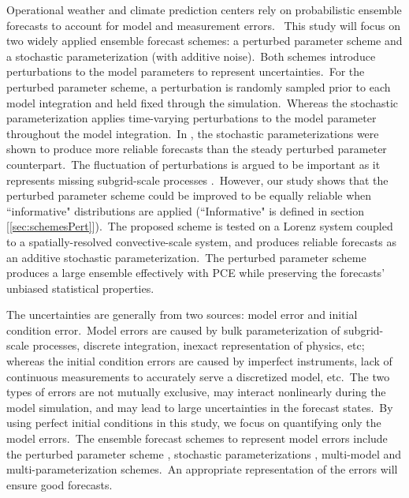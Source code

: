 
	Operational weather and climate prediction centers rely on
	probabilistic ensemble forecasts to account for model and measurement errors.\ 
	This study will focus on two widely applied ensemble forecast schemes: 
	a perturbed parameter scheme and a stochastic parameterization (with additive noise).\ 
	Both schemes introduce perturbations to the model parameters to represent uncertainties.\
	For the perturbed parameter scheme, a perturbation is randomly sampled 
	prior to each model integration and held fixed through the simulation.\
	Whereas the stochastic parameterization applies time-varying perturbations 
	to the model parameter throughout the model integration.\ 
	In \citet{Arnold13}, the stochastic parameterizations were shown to 
	produce more reliable forecasts than the steady perturbed parameter counterpart.\
	The fluctuation of perturbations is argued to be important 
	as it represents missing subgrid-scale processes \citep{Palmer01}.\ 
	However, our study shows that the perturbed parameter scheme could be improved to 
	be equally reliable when ``informative" distributions are applied
	(``Informative" is defined in section  [\ref{sec:schemesPert}]).\ 
	The proposed scheme is tested on a Lorenz system
	coupled to a spatially-resolved convective-scale system,
	and produces reliable forecasts as an additive stochastic parameterization.\ 
	The perturbed parameter scheme produces a large ensemble effectively
	with PCE while preserving the forecasts' unbiased statistical properties.\


	The uncertainties are generally from two sources:
	model error and initial condition error.\
	Model errors are caused by bulk parameterization of subgrid-scale processes, 
	discrete integration, inexact representation of physics, etc;
	whereas the initial condition errors are caused by 
	imperfect instruments, lack of continuous  
	measurements to accurately serve a discretized model, etc.\
	The two types of errors are not mutually exclusive, 
	may interact nonlinearly during the model simulation, 
	and may lead to large uncertainties in the forecast states.\
	By using perfect initial conditions in this study, we focus on quantifying only the model errors.\
	The ensemble forecast schemes to represent model errors 
	include the perturbed parameter scheme \citep{Bowler08}, 
	stochastic parameterizations \citep{Buizza99}, multi-model \citep{Kirtman14}
	and multi-parameterization \citep{Stensrud00} schemes.\
	An appropriate representation of the errors will ensure good forecasts.\
	

